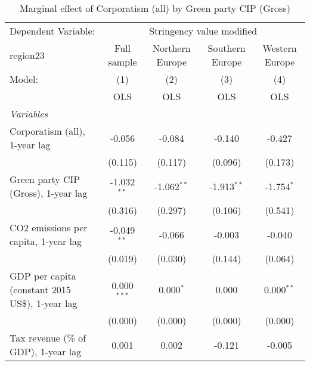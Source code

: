 
\begin{table}[htbp]
   \caption{Marginal effect of Corporatism (all) by Green party CIP (Gross)}
   \centering
   \begin{tabular}{lcccc}
      \toprule
      Dependent Variable: & \multicolumn{4}{c}{Stringency value modified}\\
      region23                                                            & Full sample   & Northern Europe & Southern Europe & Western Europe \\   
      Model:                                                              & (1)           & (2)             & (3)             & (4)\\  
                                                                          &  OLS          & OLS             & OLS             & OLS\\  
      \midrule
      \emph{Variables}\\
      Corporatism (all), 1-year lag                                       & -0.056        & -0.084          & -0.140          & -0.427\\   
                                                                          & (0.115)       & (0.117)         & (0.096)         & (0.173)\\   
      Green party CIP (Gross), 1-year lag                                 & -1.032$^{**}$ & -1.062$^{**}$   & -1.913$^{**}$   & -1.754$^{*}$\\   
                                                                          & (0.316)       & (0.297)         & (0.106)         & (0.541)\\   
      CO2 emissions per capita, 1-year lag                                & -0.049$^{**}$ & -0.066          & -0.003          & -0.040\\   
                                                                          & (0.019)       & (0.030)         & (0.144)         & (0.064)\\   
      GDP per capita (constant 2015 US\$), 1-year lag                     & 0.000$^{***}$ & 0.000$^{*}$     & 0.000           & 0.000$^{**}$\\   
                                                                          & (0.000)       & (0.000)         & (0.000)         & (0.000)\\   
      Tax revenue (\% of GDP), 1-year lag                                 & 0.001         & 0.002           & -0.121          & -0.005\\   

\end{tabular}
\end{table}
